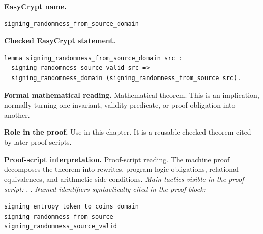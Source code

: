 \begin{formaltheorem}
\noindent\textbf{EasyCrypt name.}
\begin{lstlisting}[language=EasyCrypt,basicstyle=\ttfamily\scriptsize]
signing_randomness_from_source_domain
\end{lstlisting}
\noindent\textbf{Checked EasyCrypt statement.}
\begin{lstlisting}[language=EasyCrypt,basicstyle=\ttfamily\scriptsize]
lemma signing_randomness_from_source_domain src :
  signing_randomness_source_valid src =>
  signing_randomness_domain (signing_randomness_from_source src).
\end{lstlisting}
\noindent\textbf{Formal mathematical reading.}
Mathematical theorem. This is an implication, normally turning one invariant, validity predicate, or proof obligation into another.

\noindent\textbf{Role in the proof.}
Use in this chapter. It is a reusable checked theorem cited by later proof scripts.

\noindent\textbf{Proof-script interpretation.}
Proof-script reading. The machine proof decomposes the theorem into rewrites, program-logic obligations, relational equivalences, and arithmetic side conditions.
\emph{Main tactics visible in the proof script:} , .
\emph{Named identifiers syntactically cited in the proof block:}
\begin{lstlisting}[language=EasyCrypt,basicstyle=\ttfamily\scriptsize]
signing_entropy_token_to_coins_domain
signing_randomness_from_source
signing_randomness_source_valid
\end{lstlisting}

\end{formaltheorem}

